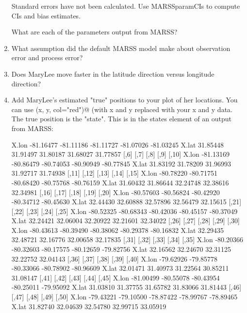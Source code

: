 \begin{hwenumerate}
\begin{enumerate}[label=\alph*)]
\begin{Schunk}
\begin{Soutput}
Standard errors have not been calculated. 
Use MARSSparamCIs to compute CIs and bias estimates.
\end{Soutput}
\end{Schunk}
What are each of the parameters output from MARSS? 
\item What assumption did the default MARSS model make about observation error and process error?
\item Does MaryLee move faster in the latitude direction versus longitude direction?
\item Add MaryLee's estimated "true" positions to your plot of her locations. You can use \verb@lines(x, y, col="red")@ (with x and y replaced with your x and y data. The true position is the "state".  This is in the states element of an output from MARSS:
\begin{Schunk}
\begin{Soutput}
           [,1]      [,2]      [,3]      [,4]      [,5]
X.lon -81.16477 -81.11186 -81.11727 -81.07026 -81.03245
X.lat  31.85448  31.91497  31.80187  31.68027  31.77857
           [,6]      [,7]      [,8]      [,9]     [,10]
X.lon -81.13169 -80.86479 -80.74053 -80.90949 -80.77845
X.lat  31.83192  31.78209  31.96993  31.92717  31.74938
          [,11]     [,12]     [,13]     [,14]     [,15]
X.lon -80.78220 -80.71751 -80.68420 -80.75768 -80.76159
X.lat  31.60432  31.86644  32.24748  32.38616  32.34981
          [,16]     [,17]     [,18]     [,19]     [,20]
X.lon -80.57603 -80.56824 -80.42920 -80.34712 -80.45630
X.lat  32.44430  32.60888  32.57896  32.56479  32.15615
          [,21]     [,22]     [,23]     [,24]     [,25]
X.lon -80.52325 -80.68343 -80.42036 -80.45157 -80.37049
X.lat  32.24421  32.06004  32.20922  32.21601  32.34022
          [,26]     [,27]     [,28]     [,29]     [,30]
X.lon -80.43613 -80.39490 -80.38062 -80.29378 -80.16832
X.lat  32.29435  32.48721  32.16776  32.00658  32.17835
          [,31]     [,32]     [,33]     [,34]     [,35]
X.lon -80.20366 -80.32603 -80.17575 -80.12659 -79.82756
X.lat  32.16562  32.24670  32.31125  32.22752  32.04143
          [,36]     [,37]     [,38]     [,39]     [,40]
X.lon -79.62926 -79.85778 -80.33066 -80.78902 -80.96609
X.lat  32.01471  31.40973  31.22564  30.85211  31.08147
          [,41]     [,42]     [,43]     [,44]     [,45]
X.lon -81.00499 -80.55078 -80.43954 -80.25011 -79.95092
X.lat  31.03810  31.37755  31.65782  31.83066  31.81443
          [,46]     [,47]     [,48]     [,49]     [,50]
X.lon -79.43221 -79.10500 -78.87422 -78.99767 -78.89465
X.lat  31.82740  32.04639  32.54780  32.99715  33.05919

\end{Soutput}
\end{Schunk}
\end{enumerate}
\end{hwenumerate}
